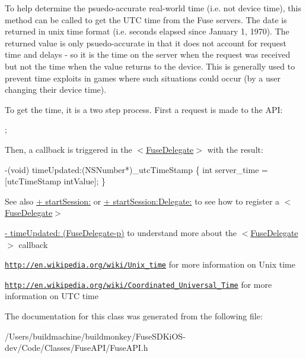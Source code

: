 To help determine the psuedo-\/accurate real-\/world time (i.\+e. not device time), this method can be called to get the U\+T\+C time from the Fuse servers. The date is returned in unix time format (i.\+e. seconds elapsed since January 1, 1970). The returned value is only psuedo-\/accurate in that it does not account for request time and delays -\/ so it is the time on the server when the request was received but not the time when the value returns to the device. This is generally used to prevent time exploits in games where such situations could occur (by a user changing their device time).

To get the time, it is a two step process. First a request is made to the A\+P\+I\+:


\begin{DoxyCode}
;
\end{DoxyCode}


Then, a callback is triggered in the $<$\hyperlink{protocol_fuse_delegate-p}{Fuse\+Delegate}$>$ with the result\+:


\begin{DoxyCode}
-(void) timeUpdated:(NSNumber*)\_utcTimeStamp
\{
   \textcolor{keywordtype}{int} server\_time = [utcTimeStamp intValue];
\}
\end{DoxyCode}


\begin{DoxySeeAlso}{See also}
\hyperlink{interface_fuse_a_p_i_ab8c3327287bfed0a8a9c74e6664d7717}{+ start\+Session\+:} or \hyperlink{interface_fuse_a_p_i_aab1649c81002a336ca872da6fef36b8d}{+ start\+Session\+:\+Delegate\+:} to see how to register a $<$\hyperlink{protocol_fuse_delegate-p}{Fuse\+Delegate}$>$ 

\hyperlink{protocol_fuse_delegate-p_a85c5468cf940315584698956edcbbdfd}{-\/ time\+Updated\+: (\+Fuse\+Delegate-\/p)} to understand more about the $<$\hyperlink{protocol_fuse_delegate-p}{Fuse\+Delegate}$>$ callback 

\href{http://en.wikipedia.org/wiki/Unix_time}{\tt http\+://en.\+wikipedia.\+org/wiki/\+Unix\+\_\+time} for more information on Unix time 

\href{http://en.wikipedia.org/wiki/Coordinated_Universal_Time}{\tt http\+://en.\+wikipedia.\+org/wiki/\+Coordinated\+\_\+\+Universal\+\_\+\+Time} for more information on U\+T\+C time 
\end{DoxySeeAlso}


The documentation for this class was generated from the following file\+:\begin{DoxyCompactItemize}
\item 
/\+Users/buildmachine/buildmonkey/\+Fuse\+S\+D\+Ki\+O\+S-\/dev/\+Code/\+Classes/\+Fuse\+A\+P\+I/Fuse\+A\+P\+I.\+h\end{DoxyCompactItemize}
